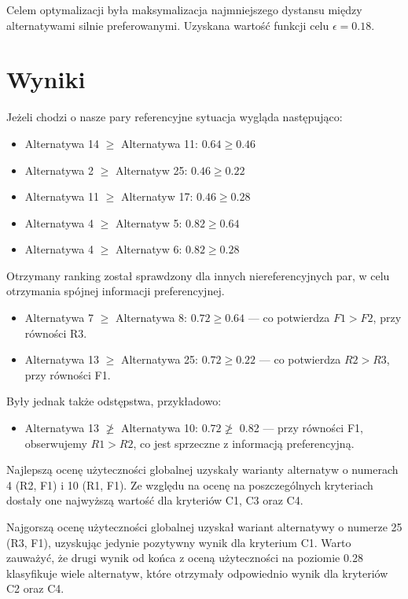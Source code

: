 \documentclass[11pt]{article}
\begin{document}
Celem optymalizacji była maksymalizacja najmniejszego dystansu między alternatywami silnie preferowanymi. Uzyskana wartość funkcji celu $\epsilon = 0.18$.

\section{Wyniki}\label{sec:wyniki}
Jeżeli chodzi o nasze pary referencyjne sytuacja wygląda następująco:
\begin{itemize}
\item Alternatywa 14 $\geq$ Alternatywa 11: $0.64 \geq 0.46$
\item Alternatywa 2 $\geq$ Alternatyw 25: $0.46 \geq 0.22$
\item Alternatywa 11 $\geq$ Alternatyw 17: $0.46 \geq 0.28$
\item Alternatywa 4 $\geq$ Alternatyw 5: $0.82 \geq 0.64$
\item Alternatywa 4 $\geq$ Alternatyw 6: $0.82 \geq 0.28$
\end{itemize}

Otrzymany ranking został sprawdzony dla innych niereferencyjnych par, w celu otrzymania spójnej informacji preferencyjnej.
\begin{itemize}
\item Alternatywa 7 $\geq$ Alternatywa 8: $0.72 \geq 0.64$ --- co potwierdza $F1 > F2$, przy równości R3.
\item Alternatywa 13 $\geq$ Alternatywa 25: $0.72 \geq 0.22$ --- co potwierdza $R2 > R3$, przy równości F1.
\end{itemize}
Były jednak także odstępstwa, przykładowo:
\begin{itemize}
\item Alternatywa 13 $\not\geq$ Alternatywa 10: $0.72 \not\geq $ 0.82 --- przy równości F1, obserwujemy $R1 > R2$, co jest sprzeczne z informacją preferencyjną.
\end{itemize}

Najlepszą ocenę użyteczności globalnej uzyskały warianty alternatyw o numerach 4 (R2, F1) i 10 (R1, F1). Ze względu na ocenę na poszczególnych kryteriach dostały one najwyższą wartość dla kryteriów C1, C3 oraz C4.

Najgorszą ocenę użyteczności globalnej uzyskał wariant alternatywy o numerze 25 (R3, F1), uzyskując jedynie pozytywny wynik dla kryterium C1. Warto zauważyć, że drugi wynik od końca z oceną użyteczności na poziomie 0.28 klasyfikuje wiele alternatyw, które otrzymały odpowiednio wynik dla kryteriów C2 oraz C4.
\end{document}

